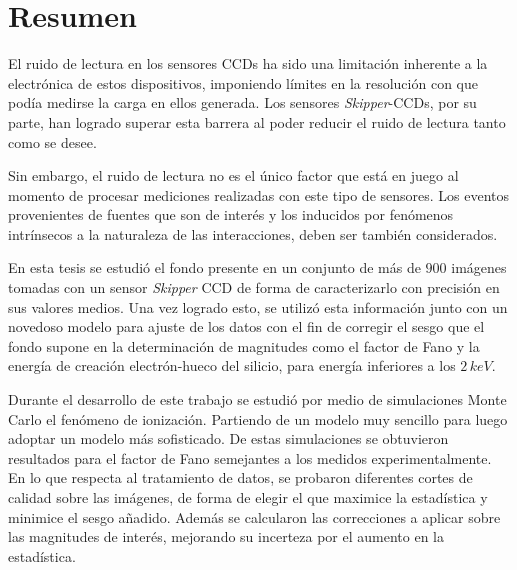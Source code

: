 \newpage
\chapter*{Resumen}
\thispagestyle{empty}
\noindent El ruido de lectura en los sensores CCDs ha sido una limitación inherente a la electrónica de estos dispositivos, imponiendo límites en la resolución con que podía medirse la carga en ellos generada. Los sensores \textit{Skipper}-CCDs, por su parte, han logrado superar esta barrera al poder reducir el ruido de lectura tanto como se desee.

Sin embargo, el ruido de lectura no es el único factor que está en juego al momento de procesar mediciones realizadas con este tipo de sensores. Los eventos provenientes de fuentes que son de interés y los inducidos por fenómenos intrínsecos a la naturaleza de las interacciones, deben ser también considerados.

En esta tesis se estudió el fondo presente en un conjunto de más de $900$ imágenes tomadas con un sensor \textit{Skipper} CCD de forma de caracterizarlo con precisión en sus valores medios. Una vez logrado esto, se utilizó esta información junto con un novedoso modelo para ajuste de los datos con el fin de corregir el sesgo que el fondo supone en la determinación de magnitudes como el factor de Fano y la energía de creación electrón-hueco del silicio, para energía inferiores a los $2\,\si{keV}$.

Durante el desarrollo de este trabajo se estudió por medio de simulaciones Monte Carlo el fenómeno de ionización. Partiendo de un modelo muy sencillo para luego adoptar un modelo más sofisticado. De estas simulaciones se obtuvieron resultados para el factor de Fano semejantes a los medidos experimentalmente. En lo que respecta al tratamiento de datos, se probaron diferentes cortes de calidad sobre las imágenes, de forma de elegir el que maximice la estadística y minimice el sesgo añadido. Además se calcularon las correcciones a aplicar sobre las magnitudes de interés, mejorando su incerteza por el aumento en la estadística.

